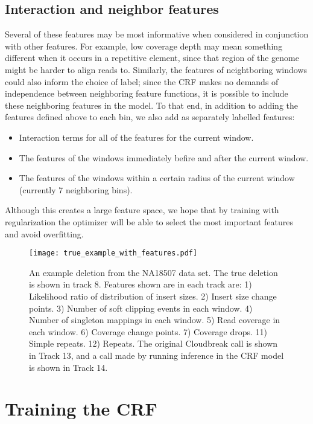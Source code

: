 \subsection{Interaction and neighbor features}

Several of these features may be most informative when considered in conjunction with other features. For example, low coverage depth may mean something different when it occurs in a repetitive element, since that region of the genome might be harder to align reads to. Similarly, the features of neightboring windows could also inform the choice of label; since the CRF makes no demands of independence between neighboring feature functions, it is possible to include these neighboring features in the model. To that end, in addition to adding the features defined above to each bin, we also add as separately labelled features:

\begin{itemize}
\item Interaction terms for all of the features for the current window. 
\item The features of the windows immediately befire and after the current window.
\item The features of the windows within a certain radius of the current window (currently 7 neighboring bins).
\end{itemize}

Although this creates a large feature space, we hope that by training with regularization the optimizer will be able to select the most important features and avoid overfitting.
\begin{figure}
\centering
\texttt{[image: true\_example\_with\_features.pdf]}
\caption{An example deletion from the NA18507 data set. The true deletion is shown in track 8. Features shown are in each track are: 1) Likelihood ratio of distribution of insert sizes. 2) Insert size change points. 3) Number of soft clipping events in each window. 4) Number of singleton mappings in each window. 5) Read coverage in each window. 6) Coverage change points. 7) Coverage drops. 11) Simple repeats. 12) Repeats. The original Cloudbreak call is shown in Track 13, and a call made by running inference in the CRF model is shown in Track 14.}
\label{crf_features_example}
\end{figure}

\section{Training the CRF}

